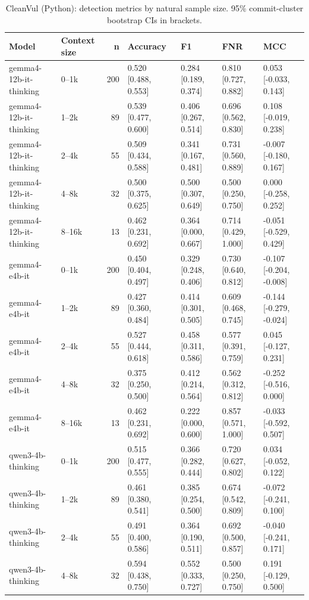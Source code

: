\begin{table}
\caption{CleanVul (Python): detection metrics by natural sample size. 95\% commit-cluster bootstrap CIs in brackets.}
\label{tab:context_size_cleanvul}
\begin{tabular}{llrllll}
\toprule
Model & Context size & n & Accuracy & F1 & FNR & MCC \\
\midrule
gemma4-12b-it-thinking & 0–1k & 200 & 0.520 [0.488, 0.553] & 0.284 [0.189, 0.374] & 0.810 [0.727, 0.882] & 0.053 [-0.033, 0.143] \\
gemma4-12b-it-thinking & 1–2k & 89 & 0.539 [0.477, 0.600] & 0.406 [0.267, 0.514] & 0.696 [0.562, 0.830] & 0.108 [-0.019, 0.238] \\
gemma4-12b-it-thinking & 2–4k & 55 & 0.509 [0.434, 0.588] & 0.341 [0.167, 0.481] & 0.731 [0.560, 0.889] & -0.007 [-0.180, 0.167] \\
gemma4-12b-it-thinking & 4–8k & 32 & 0.500 [0.375, 0.625] & 0.500 [0.307, 0.649] & 0.500 [0.250, 0.750] & 0.000 [-0.258, 0.252] \\
gemma4-12b-it-thinking & 8–16k & 13 & 0.462 [0.231, 0.692] & 0.364 [0.000, 0.667] & 0.714 [0.429, 1.000] & -0.051 [-0.529, 0.429] \\
gemma4-e4b-it & 0–1k & 200 & 0.450 [0.404, 0.497] & 0.329 [0.248, 0.406] & 0.730 [0.640, 0.812] & -0.107 [-0.204, -0.008] \\
gemma4-e4b-it & 1–2k & 89 & 0.427 [0.360, 0.484] & 0.414 [0.301, 0.505] & 0.609 [0.468, 0.745] & -0.144 [-0.279, -0.024] \\
gemma4-e4b-it & 2–4k & 55 & 0.527 [0.444, 0.618] & 0.458 [0.311, 0.586] & 0.577 [0.391, 0.759] & 0.045 [-0.127, 0.231] \\
gemma4-e4b-it & 4–8k & 32 & 0.375 [0.250, 0.500] & 0.412 [0.214, 0.564] & 0.562 [0.312, 0.812] & -0.252 [-0.516, 0.000] \\
gemma4-e4b-it & 8–16k & 13 & 0.462 [0.231, 0.692] & 0.222 [0.000, 0.600] & 0.857 [0.571, 1.000] & -0.033 [-0.592, 0.507] \\
qwen3-4b-thinking & 0–1k & 200 & 0.515 [0.477, 0.555] & 0.366 [0.282, 0.444] & 0.720 [0.627, 0.802] & 0.034 [-0.052, 0.122] \\
qwen3-4b-thinking & 1–2k & 89 & 0.461 [0.380, 0.541] & 0.385 [0.254, 0.500] & 0.674 [0.542, 0.809] & -0.072 [-0.241, 0.100] \\
qwen3-4b-thinking & 2–4k & 55 & 0.491 [0.400, 0.586] & 0.364 [0.190, 0.511] & 0.692 [0.500, 0.857] & -0.040 [-0.241, 0.171] \\
qwen3-4b-thinking & 4–8k & 32 & 0.594 [0.438, 0.750] & 0.552 [0.333, 0.727] & 0.500 [0.250, 0.750] & 0.191 [-0.129, 0.500] \\

\end{tabular}
\end{table}
